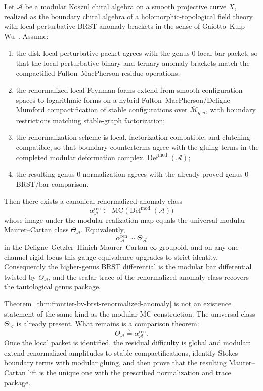 \begin{theorem}
\label{thm:frontier-bv-brst-renormalized-anomaly}
Let $\mathcal A$ be a modular Koszul chiral algebra on a smooth projective
curve $X$, realized as the boundary chiral algebra of a
holomorphic-topological field theory with local perturbative BRST anomaly
brackets in the sense of Gaiotto--Kulp--Wu~\cite{GKW24}.  Assume:
\begin{enumerate}[label=\textup{(\roman*)}]
\item the disk-local perturbative packet agrees with the genus-$0$ local
  bar packet, so that the local perturbative binary and ternary anomaly
  brackets match the compactified Fulton--MacPherson residue operations;
\item the renormalized local Feynman forms extend from smooth
  configuration spaces to logarithmic forms on a hybrid
  Fulton--MacPherson/Deligne--Mumford compactification of stable
  configurations over $\overline{\mathcal M}_{g,n}$, with boundary
  restrictions matching stable-graph factorization;
\item the renormalization scheme is local, factorization-compatible, and
  clutching-compatible, so that boundary counterterms agree with the
  gluing terms in the completed modular deformation complex
  $\operatorname{Def}^{\mathrm{mod}}(\mathcal A)$;
\item the resulting genus-$0$ normalization agrees with the already-proved
  genus-$0$ BRST/bar comparison.
\end{enumerate}
Then there exists a canonical renormalized anomaly class
\[
\alpha^{\mathrm{ren}}_{\mathcal A}
\in
\operatorname{MC}\!\bigl(\operatorname{Def}^{\mathrm{mod}}(\mathcal A)\bigr)
\]
whose image under the modular realization map equals the universal modular
Maurer--Cartan class $\Theta_{\mathcal A}$.
Equivalently,
\[
\alpha^{\mathrm{ren}}_{\mathcal A} \sim \Theta_{\mathcal A}
\]
in the Deligne--Getzler--Hinich Maurer--Cartan $\infty$-groupoid, and on
any one-channel rigid locus this gauge-equivalence upgrades to strict
identity.
Consequently the higher-genus BRST differential is the modular bar
differential twisted by $\Theta_{\mathcal A}$, and the scalar trace of the
renormalized anomaly class recovers the tautological genus package.
\end{theorem}

\begin{remark}
\label{rem:frontier-renormalized-anomaly-position}
Theorem~\ref{thm:frontier-bv-brst-renormalized-anomaly} is not an existence
statement of the same kind as the modular MC construction.
The universal class $\Theta_{\mathcal A}$ is already present.
What remains is a comparison theorem:
\[
\Theta_{\mathcal A} \stackrel{?}{=} \alpha^{\mathrm{ren}}_{\mathcal A}.
\]
Once the local packet is identified, the residual difficulty is global and
modular: extend renormalized amplitudes to stable compactifications,
identify Stokes boundary terms with modular gluing, and then prove that the
resulting Maurer--Cartan lift is the unique one with the prescribed
normalization and trace package.
\end{remark}

